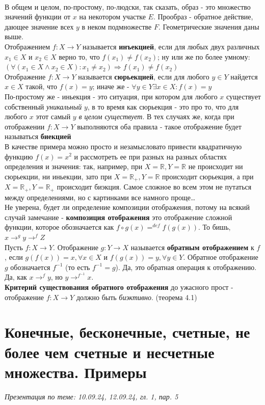 \documentclass[10pt, a4paper,twocolumn]{article}
\begin{document}
\\В общем и целом, по-простому, по-людски, так сказать, образ - это множество значений функции от $x$ на некотором участке $E$. Прообраз - обратное действие, дающее значение всех $y$ в неком подмножестве $F$. Геометрические значения даны выше.
\\Отображением $f : X \to Y$ называется \textbf{инъекцией}, если для любых двух различных $x_{1} \in X$ и $x_{2} \in X$ верно то, что $f(x_{1}) \neq f(x_{2})$;  ну или же по более умному: $(\forall (x_{1} \in X \wedge x_{2} \in X) : x_{1} \neq x_{2}) \Rightarrow f(x_{1}) \neq f(x_{2})$
\\Отображение $f : X \to Y$ называется \textbf{сюрьекцией}, если для любого $y \in Y$ найдется $x \in X$ такой, что $f(x) = y$; иначе же - $\forall y \in Y \exists x \in X : f(x) = y$
\\По-простому же - иньекция - это ситуация, при котором для любого $x$ существует собственный \textsl{уникальный} $y$, в то время как сюрьекция - это про то, что для любого $x$ этот самый $y$ \textsl{в целом существует}. В тех случаях же, когда при отображении $f : X \to Y$ выполняются оба правила - такое отображение будет называться \textbf{биекцией}
\\В качестве примера можно просто и незамысловато привести квадратичную функцию $f(x) = x^{2}$ и рассмотреть ее при разных на разных областях определения и значения: так, например, при $X = \mathbb{R}, Y = \mathbb{R}$ не происходит ни сюрьекции, ни иньекции, зато при $X = \mathbb{R}_{+}, Y = \mathbb{R}$ происходит сюрьекция, а при $X = \mathbb{R}_{+}, Y = \mathbb{R}_{+}$ происходит биэкция. Самое сложное во всем этом не путаться между определениями, но с картинками все намного проще\dots
\\Не уверена, будет ли определение композиции отображения, потому на всякий случай замечание - \textbf{композиция отображения} это отображение сложной функции, которое обозначается как $f \circ g(x) =^{def} f(g(x))$. То бишь, $x \rightarrow^{g} y \rightarrow^{f} Z$
\\Пусть $f : X \rightarrow Y$. Отображение $g : Y \rightarrow X$ называется \textbf{обратным отображением} к $f$, если $g(f(x)) = x, \forall x \in X$ и $f(g(x)) = y, \forall y \in Y$. Обратное отображение $g$ обозначается $f^{-1}$ (то есть $f^{-1} = g$). Да, это обратная операция к отображению. Да, как $x \rightarrow^{f} y$, но $y \rightarrow^{f^{-1}} x$. 
\\\textbf{Критерий существования обратного отображения} до ужасного прост - отображение $f : X \rightarrow Y$ должно быть \textsl{биэктивно}. (теорема 4.1)

\section{Конечные, бесконечные, счетные, не более чем счетные и несчетные множества. Примеры}
\textsl{Презентация по теме: 10.09.24, 12.09.24, гл. 1, пар. 5}
\end{document}
